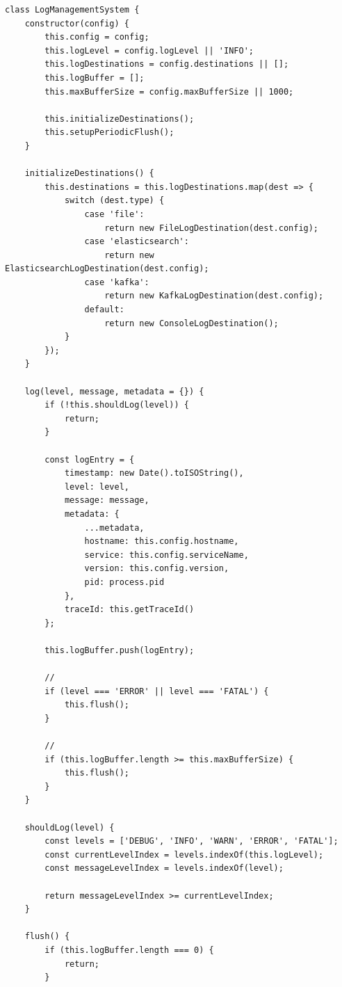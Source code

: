 \begin{lstlisting}[style=javascript]
class LogManagementSystem {
    constructor(config) {
        this.config = config;
        this.logLevel = config.logLevel || 'INFO';
        this.logDestinations = config.destinations || [];
        this.logBuffer = [];
        this.maxBufferSize = config.maxBufferSize || 1000;
        
        this.initializeDestinations();
        this.setupPeriodicFlush();
    }
    
    initializeDestinations() {
        this.destinations = this.logDestinations.map(dest => {
            switch (dest.type) {
                case 'file':
                    return new FileLogDestination(dest.config);
                case 'elasticsearch':
                    return new ElasticsearchLogDestination(dest.config);
                case 'kafka':
                    return new KafkaLogDestination(dest.config);
                default:
                    return new ConsoleLogDestination();
            }
        });
    }
    
    log(level, message, metadata = {}) {
        if (!this.shouldLog(level)) {
            return;
        }
        
        const logEntry = {
            timestamp: new Date().toISOString(),
            level: level,
            message: message,
            metadata: {
                ...metadata,
                hostname: this.config.hostname,
                service: this.config.serviceName,
                version: this.config.version,
                pid: process.pid
            },
            traceId: this.getTraceId()
        };
        
        this.logBuffer.push(logEntry);
        
        // 
        if (level === 'ERROR' || level === 'FATAL') {
            this.flush();
        }
        
        // 
        if (this.logBuffer.length >= this.maxBufferSize) {
            this.flush();
        }
    }
    
    shouldLog(level) {
        const levels = ['DEBUG', 'INFO', 'WARN', 'ERROR', 'FATAL'];
        const currentLevelIndex = levels.indexOf(this.logLevel);
        const messageLevelIndex = levels.indexOf(level);
        
        return messageLevelIndex >= currentLevelIndex;
    }
    
    flush() {
        if (this.logBuffer.length === 0) {
            return;
        }
        

\end{lstlisting}
